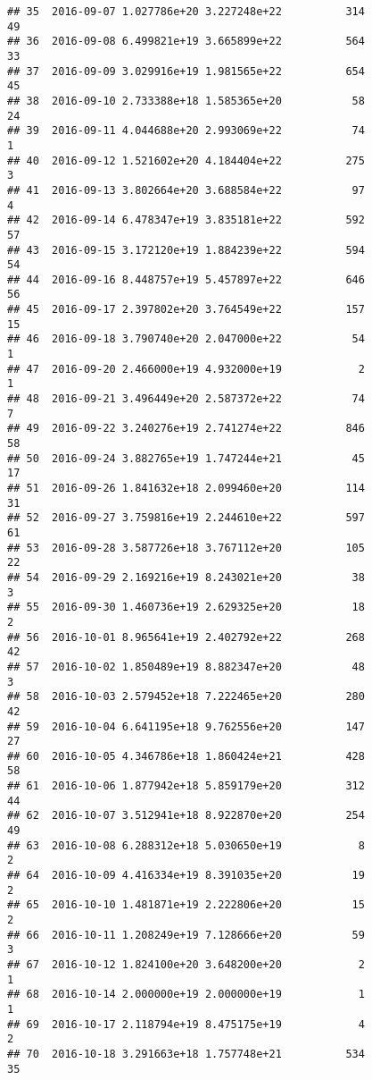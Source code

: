 \documentclass[]{article}
\begin{document}
\begin{verbatim}
## 35  2016-09-07 1.027786e+20 3.227248e+22          314              49
## 36  2016-09-08 6.499821e+19 3.665899e+22          564              33
## 37  2016-09-09 3.029916e+19 1.981565e+22          654              45
## 38  2016-09-10 2.733388e+18 1.585365e+20           58              24
## 39  2016-09-11 4.044688e+20 2.993069e+22           74               1
## 40  2016-09-12 1.521602e+20 4.184404e+22          275               3
## 41  2016-09-13 3.802664e+20 3.688584e+22           97               4
## 42  2016-09-14 6.478347e+19 3.835181e+22          592              57
## 43  2016-09-15 3.172120e+19 1.884239e+22          594              54
## 44  2016-09-16 8.448757e+19 5.457897e+22          646              56
## 45  2016-09-17 2.397802e+20 3.764549e+22          157              15
## 46  2016-09-18 3.790740e+20 2.047000e+22           54               1
## 47  2016-09-20 2.466000e+19 4.932000e+19            2               1
## 48  2016-09-21 3.496449e+20 2.587372e+22           74               7
## 49  2016-09-22 3.240276e+19 2.741274e+22          846              58
## 50  2016-09-24 3.882765e+19 1.747244e+21           45              17
## 51  2016-09-26 1.841632e+18 2.099460e+20          114              31
## 52  2016-09-27 3.759816e+19 2.244610e+22          597              61
## 53  2016-09-28 3.587726e+18 3.767112e+20          105              22
## 54  2016-09-29 2.169216e+19 8.243021e+20           38               3
## 55  2016-09-30 1.460736e+19 2.629325e+20           18               2
## 56  2016-10-01 8.965641e+19 2.402792e+22          268              42
## 57  2016-10-02 1.850489e+19 8.882347e+20           48               3
## 58  2016-10-03 2.579452e+18 7.222465e+20          280              42
## 59  2016-10-04 6.641195e+18 9.762556e+20          147              27
## 60  2016-10-05 4.346786e+18 1.860424e+21          428              58
## 61  2016-10-06 1.877942e+18 5.859179e+20          312              44
## 62  2016-10-07 3.512941e+18 8.922870e+20          254              49
## 63  2016-10-08 6.288312e+18 5.030650e+19            8               2
## 64  2016-10-09 4.416334e+19 8.391035e+20           19               2
## 65  2016-10-10 1.481871e+19 2.222806e+20           15               2
## 66  2016-10-11 1.208249e+19 7.128666e+20           59               3
## 67  2016-10-12 1.824100e+20 3.648200e+20            2               1
## 68  2016-10-14 2.000000e+19 2.000000e+19            1               1
## 69  2016-10-17 2.118794e+19 8.475175e+19            4               2
## 70  2016-10-18 3.291663e+18 1.757748e+21          534              35

\end{verbatim}
\end{document}

